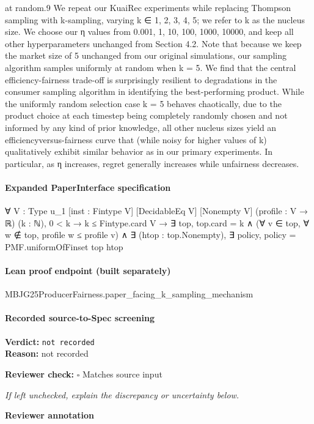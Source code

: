 \documentclass[10pt]{article}
\newcommand{\reviewerbox}{%
  \par\noindent\fbox{\parbox{0.96\linewidth}{\rule{0pt}{0.38in}}}\par
}
\newcommand{\reviewmatch}[1]{%
  \par\noindent\textbf{Reviewer check:} $\square$\; #1\par
  \noindent\emph{If left unchecked, explain the discrepancy or uncertainty below.}\par
}
\begin{document}
\begin{ReviewVerbatim}
at random.9
We repeat our KuaiRec experiments while replacing Thompson sampling with k-sampling, varying k ∈
{1, 2, 3, 4, 5}; we refer to k as the nucleus size. We choose
our η values from {0.001, 1, 10, 100, 1000, 10000}, and
keep all other hyperparameters unchanged from Section 4.2.
Note that because we keep the market size of 5 unchanged
from our original simulations, our sampling algorithm samples uniformly at random when k = 5.
We find that the central efficiency-fairness trade-off is surprisingly resilient to degradations in the consumer sampling
algorithm in identifying the best-performing product. While
the uniformly random selection case k = 5 behaves chaotically, due to the product choice at each timestep being completely randomly chosen and not informed by any kind of
prior knowledge, all other nucleus sizes yield an efficiencyversus-fairness curve that (while noisy for higher values of
k) qualitatively exhibit similar behavior as in our primary
experiments. In particular, as η increases, regret generally
increases while unfairness decreases.
\end{ReviewVerbatim}


\paragraph{Expanded PaperInterface specification}
\begin{ReviewVerbatim}
∀ {V : Type u_1} [inst : Fintype V] [DecidableEq V] [Nonempty V] (profile : V → ℝ) (k : ℕ),
  0 < k →
    k ≤ Fintype.card V →
      ∃ top,
        top.card = k ∧
          (∀ v ∈ top, ∀ w ∉ top, profile w ≤ profile v) ∧
            ∃ (htop : top.Nonempty), ∃ policy, policy = PMF.uniformOfFinset top htop
\end{ReviewVerbatim}

\paragraph{Lean proof endpoint (built separately)}\begin{ReviewVerbatim}
MBJG25ProducerFairness.paper_facing_k_sampling_mechanism
\end{ReviewVerbatim}

\paragraph{Recorded source-to-Spec screening}
\textbf{Verdict:} \texttt{not recorded}
\\
\textbf{Reason:} not recorded
\reviewmatch{Matches source input}
\noindent\textbf{Reviewer annotation}\par
\reviewerbox
\clearpage
\hypertarget{source-claim-03b433e77eab6bcb}{}
\end{document}
